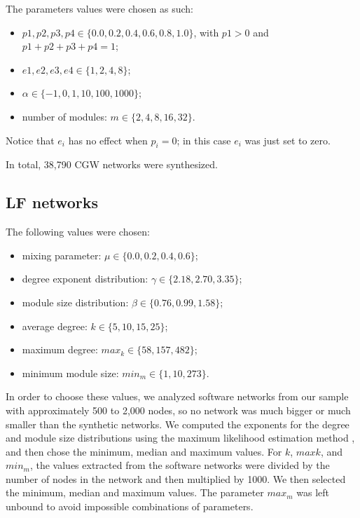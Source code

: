 The parameters values were chosen as such:

\begin{itemize}
\item $p1, p2, p3, p4 \in \{0.0, 0.2, 0.4, 0.6, 0.8, 1.0\}$, with $p1 > 0$ and
$p1 + p2 + p3 + p4 = 1$;
\item $e1, e2, e3, e4 \in \{1, 2, 4, 8\}$;
\item $\alpha \in \{-1, 0, 1, 10, 100, 1000\}$;
\item number of modules: $m \in \{2, 4, 8, 16, 32\}$.
\end{itemize}

Notice that $e_i$ has no effect when $p_i = 0$; in this case $e_i$ was just set
to zero.

In total, 38,790 CGW networks were synthesized.

\subsection{LF networks}

The following values were chosen:

\begin{itemize}
  \item mixing parameter: $\mu \in \{0.0, 0.2, 0.4, 0.6\}$;
  \item degree exponent distribution: $\gamma \in \{2.18, 2.70, 3.35\}$;
  \item module size distribution: $\beta \in \{0.76, 0.99, 1.58\}$;
  \item average degree: $k \in \{5, 10, 15, 25\}$;
  \item maximum degree: $max_k \in \{58, 157, 482\}$;
  \item minimum module size: $min_m \in \{1, 10, 273\}$.
\end{itemize}

In order to choose these values, we analyzed software networks from our sample
with approximately 500 to 2,000 nodes, so no network was much bigger or much
smaller than the synthetic networks. We computed the exponents for the degree
and module size distributions using the maximum likelihood estimation method
\cite{Clauset2007}, and then chose the minimum, median and maximum values. For
$k$, $maxk$, and $min_m$, the values extracted from the software networks were
divided by the number of nodes in the network and then multiplied by 1000. We
then selected the minimum, median and maximum values. The parameter $max_m$ was
left unbound to avoid impossible combinations of parameters.

